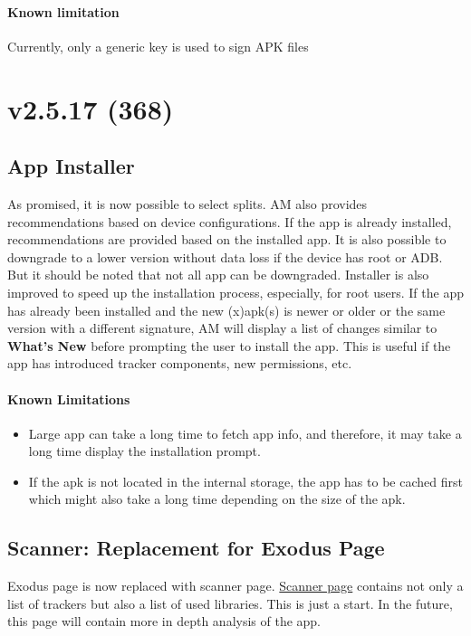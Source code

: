 \paragraph{Known limitation} Currently, only a generic key is used to sign APK files


\section{v2.5.17 (368)}

\subsection{App Installer}
As promised, it is now possible to select splits. AM also provides recommendations based on device configurations.
If the app is already installed, recommendations are provided based on the installed app. It is also possible to
downgrade to a lower version without data loss if the device has root or ADB. But it should be noted that not all app
can be downgraded. Installer is also improved to speed up the installation process, especially, for root users.
If the app has already been installed and the new (x)apk(s) is newer or older or the same version with a different
signature, AM will display a list of changes similar to \textbf{What's New} before prompting the user to install
the app. This is useful if the app has introduced tracker components, new permissions, etc.

\paragraph{Known Limitations}
\begin{itemize}
    \item Large app can take a long time to fetch app info, and therefore, it may take a long time display the installation prompt.
    \item If the apk is not located in the internal storage, the app has to be cached first which might also take
    a long time depending on the size of the apk.
\end{itemize}

\subsection{Scanner: Replacement for Exodus Page}
Exodus page is now replaced with scanner page. \hyperref[sec:scanner-page]{Scanner page} contains not only a list of
trackers but also a list of used libraries. This is just a start. In the future, this page will contain more in depth
analysis of the app.

